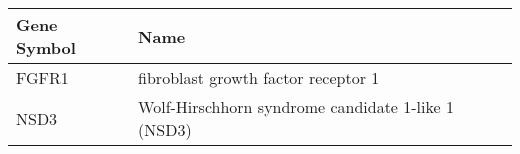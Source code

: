 \begin{tabular}{ll}
\toprule
Gene Symbol &                                               Name \\
\midrule
      FGFR1 &                fibroblast growth factor receptor 1 \\
       NSD3 & Wolf-Hirschhorn syndrome candidate 1-like 1 (NSD3) \\
\bottomrule
\end{tabular}
